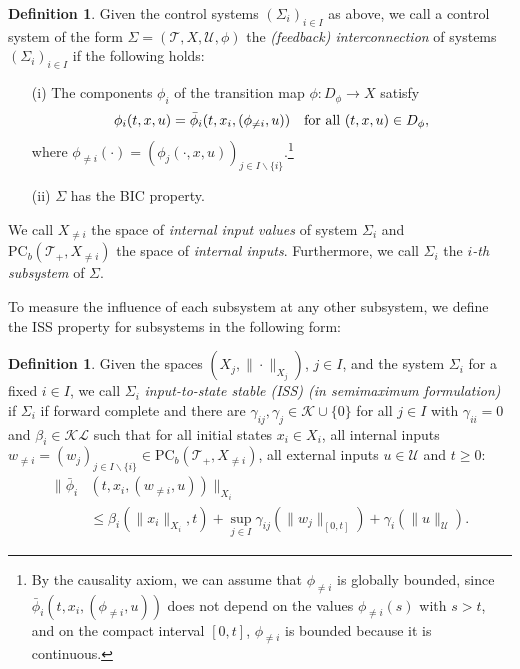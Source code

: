 \documentclass[twocolumn]{IEEEtran} %
\theoremstyle{definition}
\newtheorem{definition}[theorem]{Definition}
\newcommand{\Uc}{\mathcal{U}}%
\newcommand{\K}{\mathcal{K}}%
\newcommand{\KL}{\mathcal{KL}}%
\newcommand{\PC}{\mathrm{PC}}%
\newcommand{\T}{\ensuremath{\mathcal{T}}}  %
\begin{document}
\begin{definition}
\label{def_interconnection}
Given the control systems $(\Sigma_i)_{i \in I}$ as above, we call a control system of the form $\Sigma = (\T, X,\Uc,\phi)$ the \emph{(feedback) interconnection} of systems $(\Sigma_i)_{i\in I}$ if the following holds:%
\begin{enumerate}
\item[(i)] The components $\phi_i$ of the transition map $\phi:D_{\phi} \rightarrow X$ satisfy%
\begin{equation*}
  \phi_i(t,x,u) = \bar{\phi}_i(t,x_i,(\phi_{\neq i},u)) \mbox{\quad for all\ } (t,x,u) \in D_{\phi},%
\end{equation*}
where $\phi_{\neq i}(\cdot) = (\phi_j(\cdot,x,u))_{j \in I \backslash \{i\}}$.\footnote{By the causality axiom, we can assume that $\phi_{\neq i}$ is globally bounded, since $\bar{\phi}_i(t,x_i,(\phi_{\neq i},u))$ does not depend on the values $\phi_{\neq i}(s)$ with $s > t$, and on the compact interval $[0,t]$, $\phi_{\neq i}$ is bounded because it is continuous.}
\item[(ii)] $\Sigma$ has the BIC property.%
\end{enumerate}
We call $X_{\neq i}$ the space of \emph{internal input values} of system $\Sigma_i$ and $\PC_b(\T_+,X_{\neq i})$ the space of \emph{internal inputs}. Furthermore, we call $\Sigma_i$ the \emph{$i$-th subsystem} of $\Sigma$.%
\end{definition}

To measure the influence of each subsystem at any other subsystem, we define the ISS property for subsystems in the following form:
\begin{definition}\label{def_subsys_iss_semimax}
Given the spaces $(X_j,\|\cdot\|_{X_j})$, $j\in I$, and the system $\Sigma_i$ for a fixed $i \in I$, we call $\Sigma_i$  \emph{input-to-state stable (ISS) (in semimaximum formulation)} if $\Sigma_i$ if forward complete and there are $\gamma_{ij},\gamma_j \in \K \cup \{0\}$ for all $j \in I$ with $\gamma_{ii}=0$ and $\beta_i \in \KL$ such that for all initial states $x_i \in X_i$, all internal inputs $w_{\neq i} = (w_j)_{j\in I \backslash \{i\}} \in \PC_b(\T_+,X_{\neq i})$, all external inputs $u \in \Uc$ and $t \geq 0$:%
\begin{align}
  \|\bar{\phi}_i&(t,x_i,(w_{\neq i},u))\|_{X_i}\nonumber\\
	&\leq \beta_i(\|x_i\|_{X_i},t) + \sup_{j \in I}\gamma_{ij}(\|w_j\|_{[0,t]}) + \gamma_i(\|u\|_{\Uc}).%
\label{eq:ISS-subsystems}
\end{align}
\end{definition}
\end{document}
